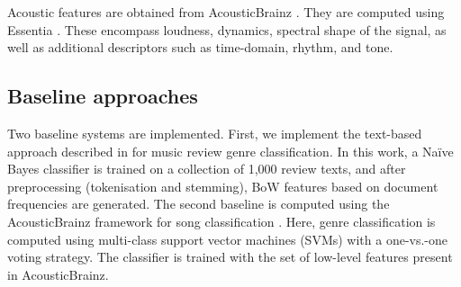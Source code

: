 Acoustic features are obtained from AcousticBrainz \citep{Porter2015}. They are computed using Essentia \citep{Bogdanov2013}. These encompass loudness, dynamics, spectral shape of the signal, as well as additional descriptors such as time-domain, rhythm, and tone.%



\subsection{Baseline approaches}
\label{sec:similarity:baselines}
Two baseline systems are implemented. First, we implement the text-based approach described in \cite{Hu2005} for music review genre classification. In this work, a Na\"{i}ve Bayes classifier is trained on a collection of 1,000 review texts, and after preprocessing (tokenisation and stemming), BoW features based on document frequencies are generated.
The second baseline is computed using the AcousticBrainz framework for song classification \cite{Porter2015}. Here, genre classification is computed using  multi-class support vector machines (SVMs) with a one-vs.-one voting strategy. The classifier is trained with the set of low-level features present in AcousticBrainz. %

